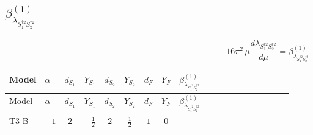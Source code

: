 \documentclass{article}
\begin{document}
\begin{landscape}
\section*{$\beta_{\lambda_{S_1^{\dagger 2}S_2^{\dagger 2}}}^{(1)}$}
\[16\pi^2\,\mu\frac{d \lambda_{S_1^{\dagger 2}S_2^{\dagger 2}}}{d\mu}=\beta_{\lambda_{S_1^{\dagger 2}S_2^{\dagger 2}}}^{(1)}\]
\tiny
\begin{longtable}{@{}llcccccc >{\raggedright\arraybackslash}p{0.54\linewidth}@{}}
\toprule
Model & $\alpha$ & $d_{S_1}$ & $Y_{S_1}$ & $d_{S_2}$ & $Y_{S_2}$ & $d_F$ & $Y_F$ & $\beta_{\lambda_{S_1^{\dagger 2}S_2^{\dagger 2}}}^{(1)}$ \\
\midrule
\endfirsthead
\toprule
Model & $\alpha$ & $d_{S_1}$ & $Y_{S_1}$ & $d_{S_2}$ & $Y_{S_2}$ & $d_F$ & $Y_F$ & $\beta_{\lambda_{S_1^{\dagger 2}S_2^{\dagger 2}}}^{(1)}$ \\
\midrule
\endhead
T3-B & $-1$ & $2$ & $-\frac{1}{2}$ & $2$ & $\frac{1}{2}$ & $1$ & $0$ & \scriptsize\adjustbox{max width=\linewidth}{$\begin{gathered} {\lambda_{S_1^{\dagger 2}S_2^{\dagger 2}}} (2 \operatorname{Tr}\!\left({y_1}\,\left({y_1}\right)^{\dagger}\right)+2 \operatorname{Tr}\!\left({y_2}\,\left({y_2}\right)^{\dagger}\right)) \\ +{\lambda_{S_1^\dagger S_2 S_2^{\dagger 2}}} (\operatorname{Tr}\!\left({y_2}\,\left({y_1}\right)^{\dagger}\right)+2 {\lambda_{S_1 S_1^{\dagger 2}S_2^\dagger}}) \\ +{\lambda_{S_1 S_1^{\dagger 2}S_2^\dagger}} \operatorname{Tr}\!\left({y_2}\,\left({y_1}\right)^{\dagger}\right) \\ -2 \operatorname{Tr}\!\left({y_2}\,\left({y_1}\right)^{\dagger}\,{y_2}\,\left({y_1}\right)^{\dagger}\right) \\ +4 {\lambda_{H^\dagger H^\dagger S_1^\dagger S_1^\dagger}} \left({\lambda_{H^\dagger H^\dagger S_2 S_2}}\right)^{*} \\ -9 {g_2}^2 {\lambda_{S_1^{\dagger 2}S_2^{\dagger 2}}} \\ -3 {g_Y}^2 {\lambda_{S_1^{\dagger 2}S_2^{\dagger 2}}} \\ +8 {\lambda_{12}} {\lambda_{S_1^{\dagger 2}S_2^{\dagger 2}}} \\ +\frac{4 {\lambda_{12}^{\rm Adj}} {\lambda_{S_1^{\dagger 2}S_2^{\dagger 2}}}}{3} \\ +{\lambda_{H H^\dagger S_1^\dagger S_2^\dagger}^{\rm Cross}}^2 \\ +2 {\lambda_{S_1}} {\lambda_{S_1^{\dagger 2}S_2^{\dagger 2}}} \\ +2 {\lambda_{S_1^{\dagger 2}S_2^{\dagger 2}}} {\lambda_{S_2}} \\ +5 {\lambda_{S_1^\dagger S_2 S_2^{\dagger 2}}}^2 \\ +5 {\lambda_{S_1 S_1^{\dagger 2}S_2^\dagger}}^2\end{gathered}$} \\

\end{longtable}
\end{landscape}
\end{document}
